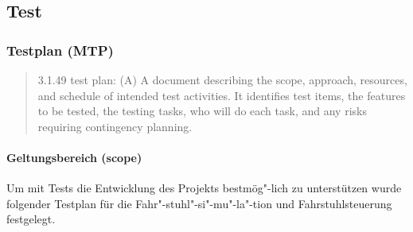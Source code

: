 \subsection{Test}

\subsubsection{Testplan (MTP)}
\begin{quote}\label{Quote:Testplan}
3.1.49 test plan: (A) A document describing the scope, approach, resources, and schedule of intended test activities. It identifies test items, the features to be tested, the testing tasks, who will do each task, and any risks requiring contingency planning. \cite[3.1 Definitions, Seite 11]{IEEE829-2008}
\end{quote}

\paragraph{Geltungsbereich (scope)}
Um mit Tests die Entwicklung des Projekts bestmög"-lich zu unterstützen wurde folgender Testplan für die Fahr"-stuhl"-si"-mu"-la"-tion und Fahrstuhlsteuerung festgelegt.

